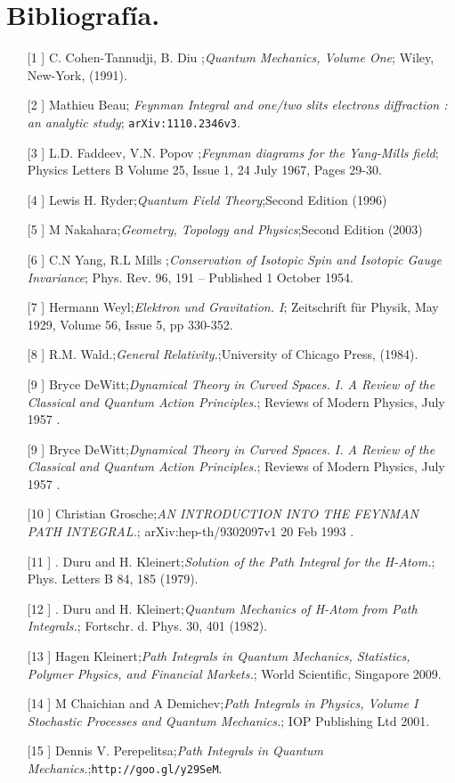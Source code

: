 \chapter{Bibliografía.}
\begin{itemize}
\item[[1]] C. Cohen-Tannudji, B. Diu ;\textit{Quantum Mechanics, Volume One}; Wiley, New-York, (1991).
\item[[2]] Mathieu Beau; \textit{Feynman Integral and one/two slits electrons diffraction : an analytic study}; \texttt{arXiv:1110.2346v3}.
\item[[3]]  L.D. Faddeev,  V.N. Popov ;\textit{Feynman diagrams for the Yang-Mills field}; Physics Letters B Volume 25, Issue 1, 24 July 1967, Pages 29-30.
\item[[4]] Lewis H. Ryder;\textit{Quantum Field Theory};Second Edition (1996) 
\item[[5]] M Nakahara;\textit{Geometry, Topology and Physics};Second Edition (2003) 
\item[[6]]  C.N Yang,  R.L Mills ;\textit{Conservation of Isotopic Spin and Isotopic Gauge Invariance}; Phys. Rev. 96, 191 – Published 1 October 1954.
\item[[7]]  Hermann Weyl;\textit{Elektron und Gravitation. I}; Zeitschrift für Physik, May 1929, Volume 56, Issue 5, pp 330-352.
\item[[8]] R.M. Wald.;\textit{General Relativity.};University of Chicago Press, (1984). 
\item[[9]]  Bryce DeWitt;\textit{Dynamical Theory in Curved Spaces. I. A Review of the Classical and Quantum Action Principles.}; Reviews of Modern Physics, July 1957 .
\item[[9]]  Bryce DeWitt;\textit{Dynamical Theory in Curved Spaces. I. A Review of the Classical and Quantum Action Principles.}; Reviews of Modern Physics, July 1957 .
\item[[10]]  Christian Grosche;\textit{AN INTRODUCTION INTO
THE FEYNMAN PATH INTEGRAL.}; arXiv:hep-th/9302097v1 20 Feb 1993 .
\item[[11]]  . Duru and H. Kleinert;\textit{Solution of the Path Integral for the H-Atom.}; Phys. Letters B 84, 185 (1979).
\item[[12]]  . Duru and H. Kleinert;\textit{Quantum Mechanics of H-Atom from Path Integrals.};  Fortschr. d. Phys. 30, 401 (1982).
\item[[13]]  Hagen Kleinert;\textit{Path Integrals in Quantum Mechanics, Statistics, Polymer Physics, and Financial Markets.};  World Scientific, Singapore 2009.
\item[[14]]  M Chaichian and A Demichev;\textit{Path Integrals in Physics, Volume I
Stochastic Processes and Quantum Mechanics.};  IOP Publishing Ltd 2001.
\item[[15]] Dennis V. Perepelitsa;\textit{Path Integrals in Quantum Mechanics.};\texttt{http://goo.gl/y29SeM}.

\end{itemize}
